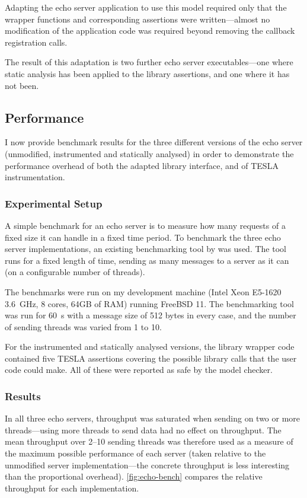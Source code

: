 Adapting the echo server application to use this model required only that the
wrapper functions and corresponding assertions were written---almost no
modification of the application code was required beyond removing the callback
registration calls.

The result of this adaptation is two further echo server executables---one where
static analysis has been applied to the library assertions, and one where it has
not been.

\subsection{Performance}

I now provide benchmark results for the three different versions of the echo
server (unmodified, instrumented and statically analysed) in order to
demonstrate the performance overhead of both the adapted library interface, and
of TESLA instrumentation.

\subsubsection{Experimental Setup}

A simple benchmark for an echo server is to measure how many requests of a fixed
size it can handle in a fixed time period. To benchmark the three echo server
implementations, an existing benchmarking tool by \textcite{hoyer_rust_2016} was
used. The tool runs for a fixed length of time, sending as many messages to a
server as it can (on a configurable number of threads).

The benchmarks were run on my development machine (Intel Xeon E5-1620
\SI{3.6}{\GHz}, 8 cores, 64GB of RAM) running FreeBSD 11. The benchmarking tool
was run for \SI{60}{\s} with a message size of 512 bytes in every case, and the
number of sending threads was varied from 1 to 10.

For the instrumented and statically analysed versions, the library wrapper code
contained five TESLA assertions covering the possible library calls that the
user code could make. All of these were reported as safe by the model checker.

\subsubsection{Results}

In all three echo servers, throughput was saturated when sending on two or more
threads---using more threads to send data had no effect on throughput. The mean
throughput over 2--10 sending threads was therefore used as a measure of the
maximum possible performance of each server (taken relative to the unmodified
server implementation---the concrete throughput is less interesting than the
proportional overhead). \autoref{fig:echo-bench} compares the relative
throughput for each implementation.

